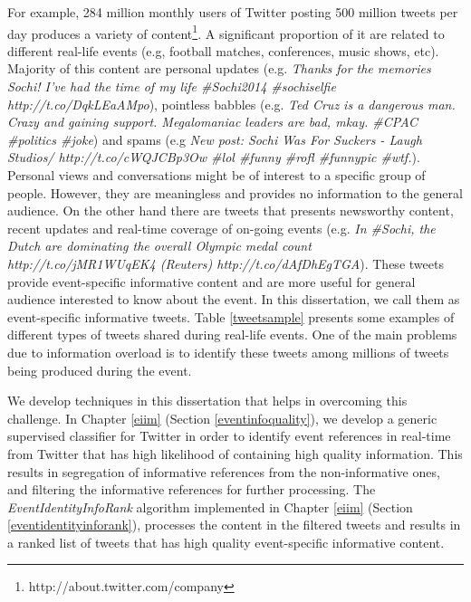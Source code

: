 For example, 284 million monthly users of Twitter posting 500 million tweets per day produces a variety of content\footnote{http://about.twitter.com/company}. A significant proportion of it are related to different real-life events (e.g, football matches, conferences, music shows, etc). Majority of this content are personal updates (e.g.  \textit{Thanks for the memories Sochi! I've had the time of my life \#Sochi2014 \#sochiselfie http://t.co/DqkLEaAMpo}), pointless babbles (e.g. \textit{Ted Cruz is a dangerous man. Crazy and gaining support. Megalomaniac leaders are bad, mkay. \#CPAC \#politics \#joke}) and spams (e.g \textit{New post: Sochi Was For Suckers - Laugh Studios/ http://t.co/cWQJCBp3Ow \#lol \#funny \#rofl \#funnypic \#wtf.}). Personal views and conversations might be of interest to a specific group of people. However, they are meaningless and provides no information to the general audience. On the other hand there are tweets that presents newsworthy content, recent updates and real-time coverage of on-going events (e.g. \textit{In \#Sochi, the Dutch are dominating the overall Olympic medal count http://t.co/jMR1WUqEK4 (Reuters) http://t.co/dAfDhEgTGA}). These tweets provide event-specific informative content and are more useful for general audience interested to know about the event. In this dissertation, we call them as event-specific informative tweets. Table \ref{tweetsample} presents some examples of different types of tweets shared during real-life events. One of the main problems due to information overload is to identify these tweets among millions of tweets being produced during the event.

We develop techniques in this dissertation that helps in overcoming this challenge. In Chapter \ref{eiim} (Section \ref{eventinfoquality}), we develop a generic supervised classifier for Twitter in order to identify event references in real-time from Twitter that has high likelihood of containing high quality information. This results in segregation of informative references from the non-informative ones, and filtering the informative references for further processing. The \textit{EventIdentityInfoRank} algorithm implemented in Chapter \ref{eiim} (Section \ref{eventidentityinforank}), processes the content in the filtered tweets and results in a ranked list of tweets that has high quality event-specific informative content. 

